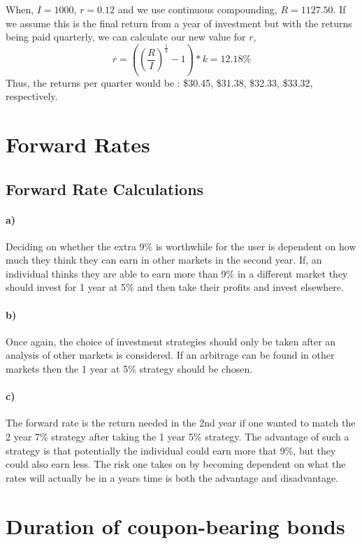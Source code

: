 When, $I = 1000$, $r = 0.12$ and we use continuous compounding, $R = 1127.50$. If we assume this is the final return from a year of investment but with the returns being paid quarterly, we can calculate our new value for $r$, 
\[r = ((\frac{R}{I})^{\frac{1}{k}} - 1) * k = 12.18\%\]
Thus, the returns per quarter would be : \$30.45, \$31.38, \$32.33, \$33.32, respectively.

\section{Forward Rates}

\subsection{Forward Rate Calculations}
\paragraph{a)} Deciding on whether the extra 9\% is worthwhile for the user is dependent on how much they think they can earn in other markets in the second year. If, an individual thinks they are able to earn more than 9\% in a different market they should invest for 1 year at 5\% and then take their profits and invest elsewhere.

\paragraph{b)} Once again, the choice of investment strategies should only be taken after an analysis of other markets is considered. If an arbitrage can be found in other markets then the 1 year at 5\% strategy should be chosen.

\paragraph{c)} The forward rate is the return needed in the 2nd year if one wanted to match the 2 year 7\% strategy after taking the 1 year 5\% strategy. The advantage of such a strategy is that potentially the individual could earn more that 9\%, but they could also earn less. The risk one takes on by becoming dependent on what the rates will actually be in a years time is both the advantage and disadvantage.

\section{Duration of coupon-bearing bonds}

